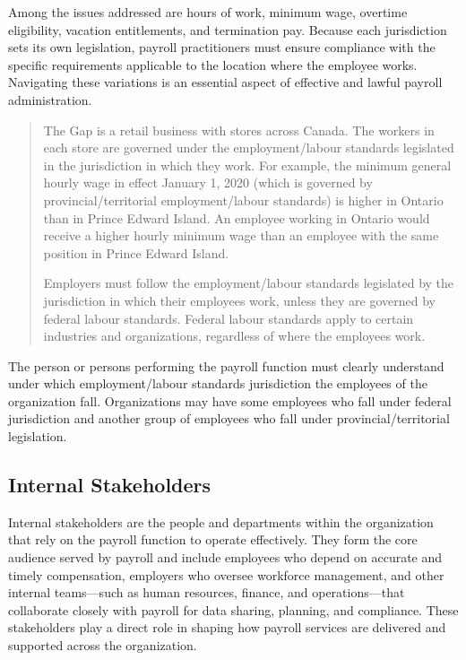 \documentclass[letterpaper,10pt,english]{sphinxmanual}
\begin{document}
\sphinxAtStartPar
Among the issues addressed are hours of work, minimum wage, overtime eligibility, vacation entitlements, and termination pay.
Because each jurisdiction sets its own legislation, payroll practitioners must ensure compliance with the specific
requirements applicable to the location where the employee works. Navigating these variations is an essential aspect of
effective and lawful payroll administration.
\begin{quote}

\sphinxAtStartPar
{}

\sphinxAtStartPar
The Gap is a retail business with stores across Canada. The workers in each store are
governed under the employment/labour standards legislated in the jurisdiction in which they
work. For example, the minimum general hourly wage in effect January 1, 2020 (which is
governed by provincial/territorial employment/labour standards) is higher in Ontario than in
Prince Edward Island. An employee working in Ontario would receive a higher hourly
minimum wage than an employee with the same position in Prince Edward Island.

\sphinxAtStartPar
Employers must follow the employment/labour standards legislated by the jurisdiction in
which their employees work, unless they are governed by federal labour standards. Federal
labour standards apply to certain industries and organizations, regardless of where the
employees work.
\end{quote}

\sphinxAtStartPar
The person or persons performing the payroll function must clearly understand under which
employment/labour standards jurisdiction the employees of the organization fall.
Organizations may have some employees who fall under federal jurisdiction and another
group of employees who fall under provincial/territorial legislation.


\subsection{Internal Stakeholders}
\label{\detokenize{compliance:internal-stakeholders}}
\sphinxAtStartPar
Internal stakeholders are the people and departments within the organization that rely on the payroll function to operate
effectively. They form the core audience served by payroll and include employees who depend on accurate and timely
compensation, employers who oversee workforce management, and other internal teams—such as human resources, finance,
and operations—that collaborate closely with payroll for data sharing, planning, and compliance. These stakeholders play a
direct role in shaping how payroll services are delivered and supported across the organization.
\end{document}
